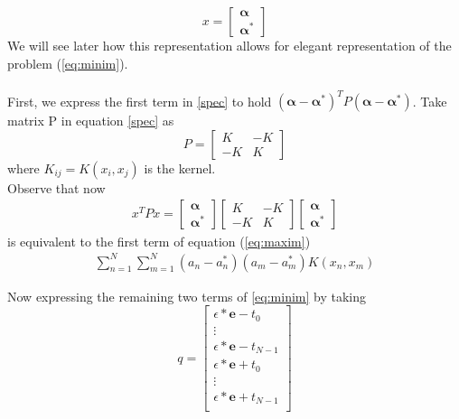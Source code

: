 \documentclass[12pt,notitlepage,twoside]{scrreprt}
\begin{document}
\[x =
  \begin{bmatrix}
    \bm{ \alpha} \\
    \bm{ \alpha^*}
  \end{bmatrix}
\]
We will see later how this representation allows for elegant representation of
the problem (\ref{eq:minim}).
\paragraph*{}
First, we express the first term in \ref{spec} to hold \((\bm{\alpha-\alpha^*})^T
P (\bm{\alpha - \alpha^*})\).
Take matrix P in equation \ref{spec} as 
\[P =
\begin{bmatrix}
       K & -K           \\
       -K & K            
     \end{bmatrix}
\]
where \(K_{ij} = K(x_i,x_j)\) is the kernel.
\\
Observe that now
\begin{gather*}
x^T P x =
  \begin{bmatrix}
    \bm{ \alpha} \\
    \bm{ \alpha^*}
  \end{bmatrix}
\begin{bmatrix}
       K & -K           \\
       -K & K            
     \end{bmatrix}
  \begin{bmatrix}
    \bm{ \alpha} \\
    \bm{ \alpha^*}
  \end{bmatrix}
\end{gather*}
is equivalent to the first term of equation (\ref{eq:maxim})
\begin{gather*}
\sum_{n=1}^{N}\sum_{m=1}^{N}(a_n-a_n^*)(a_m-a_m^*)K(x_n,x_m)
\end{gather*}

Now expressing the remaining two terms of \ref{eq:minim} by taking 
\[q =
\begin{bmatrix}
  \epsilon*\mathbf{e}-t_0           \\
  \vdots                                     \\
  \epsilon*\mathbf{e}-t_{N-1}           \\
   \epsilon*\mathbf{e}+t_0           \\
   \vdots                           \\
  \epsilon*\mathbf{e}+t_{N-1}           \\
     \end{bmatrix}
\]
\end{document}
